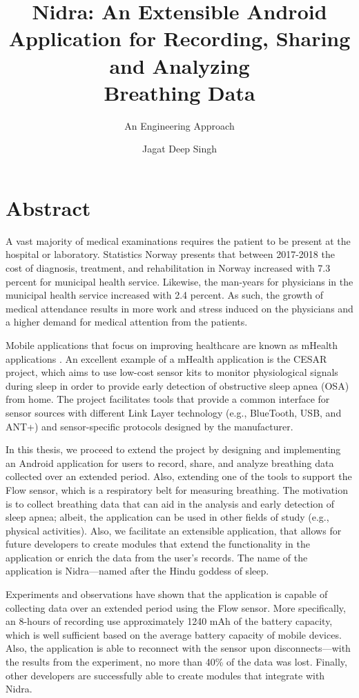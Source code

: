 \documentclass[UKenglish]{ifimaster}  %
\title{Nidra: An Extensible Android Application for Recording, Sharing and Analyzing \\ Breathing Data}
\subtitle{An Engineering Approach}
\author{Jagat Deep Singh}
\begin{document}
\duoforside[dept={Department of Informatics},   %
  program={Programming and Networks},  %
  long]                                        %

\frontmatter{}
\chapter*{Abstract}
 A vast majority of medical examinations requires the patient to be present at the hospital or laboratory. Statistics Norway \cite{ssb} presents that between 2017-2018 the cost of diagnosis, treatment, and rehabilitation in Norway increased with 7.3 percent for municipal health service. Likewise, the man-years for physicians in the municipal health service increased with 2.4 percent. As such, the growth of medical attendance results in more work and stress induced on the physicians and a higher demand for medical attention from the patients.
 
 Mobile applications that focus on improving healthcare are known as mHealth applications \cite{kumar2013mobile}. An excellent example of a mHealth application is the CESAR project, which aims to use low-cost sensor kits to monitor physiological signals during sleep in order to provide early detection of obstructive sleep apnea (OSA) \cite{cesar} from home. The project facilitates tools that provide a common interface for sensor sources with different Link Layer technology (e.g., BlueTooth, USB, and ANT+) and sensor-specific protocols designed by the manufacturer.
 
 In this thesis, we proceed to extend the project by designing and implementing an Android application for users to record, share, and analyze breathing data collected over an extended period. Also, extending one of the tools to support the Flow sensor, which is a respiratory belt for measuring breathing. The motivation is to collect breathing data that can aid in the analysis and early detection of sleep apnea; albeit, the application can be used in other fields of study (e.g., physical activities). Also, we facilitate an extensible application, that allows for future developers to create modules that extend the functionality in the application or enrich the data from the user's records. The name of the application is Nidra---named after the Hindu goddess of sleep. 
 
 Experiments and observations have shown that the application is capable of collecting data over an extended period using the Flow sensor. More specifically, an 8-hours of recording use approximately 1240 mAh of the battery capacity, which is well sufficient based on the average battery capacity of mobile devices. Also, the application is able to reconnect with the sensor upon disconnects---with the results from the experiment, no more than 40\% of the data was lost. Finally, other developers are successfully able to create modules that integrate with Nidra. 
\end{document}
